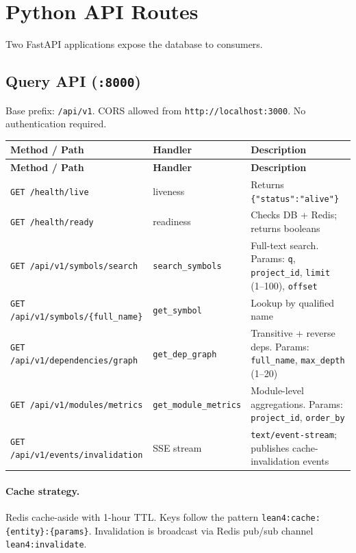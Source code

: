 
\section{Python API Routes}
\label{sec:api-routes}

Two FastAPI applications expose the database to consumers.

\subsection{Query API (\texttt{:8000})}

Base prefix: \texttt{/api/v1}.  CORS allowed from \texttt{http://localhost:3000}.
No authentication required.

\begin{longtable}{@{}llp{5.5cm}@{}}
\toprule
\textbf{Method / Path} & \textbf{Handler} & \textbf{Description} \\
\midrule
\endfirsthead
\toprule
\textbf{Method / Path} & \textbf{Handler} & \textbf{Description} \\
\midrule
\endhead
\bottomrule
\endfoot
\texttt{GET /health/live}
  & liveness & Returns \texttt{\{"status":"alive"\}} \\
\texttt{GET /health/ready}
  & readiness & Checks DB + Redis; returns booleans \\
\texttt{GET /api/v1/symbols/search}
  & \texttt{search\_symbols} & Full-text search.  Params: \texttt{q}, \texttt{project\_id}, \texttt{limit} (1--100), \texttt{offset} \\
\texttt{GET /api/v1/symbols/\{full\_name\}}
  & \texttt{get\_symbol} & Lookup by qualified name \\
\texttt{GET /api/v1/dependencies/graph}
  & \texttt{get\_dep\_graph} & Transitive + reverse deps.  Params: \texttt{full\_name}, \texttt{max\_depth} (1--20) \\
\texttt{GET /api/v1/modules/metrics}
  & \texttt{get\_module\_metrics} & Module-level aggregations.  Params: \texttt{project\_id}, \texttt{order\_by} \\
\texttt{GET /api/v1/events/invalidation}
  & SSE stream & \texttt{text/event-stream}; publishes cache-invalidation events \\
\end{longtable}

\paragraph{Cache strategy.}
Redis cache-aside with 1-hour TTL.  Keys follow the pattern
\texttt{lean4:cache:\{entity\}:\{params\}}.  Invalidation is broadcast via
Redis pub/sub channel \texttt{lean4:invalidate}.

